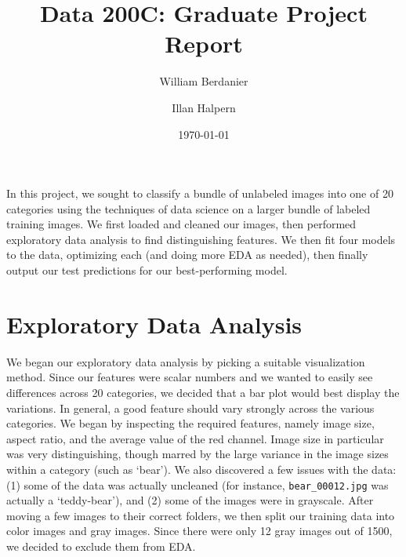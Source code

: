 \documentclass[aps,prl,twocolumn,superscriptaddress]{revtex4-1}
\renewcommand{\=}[1]{\stackrel{#1}{=}} %
\begin{document}
\title{Data 200C: Graduate Project Report}

\author{William Berdanier}

\author{Illan Halpern}

\date{\today}


\maketitle

In this project, we sought to classify a bundle of unlabeled images into one of 20 categories using the techniques of data science on a  larger bundle of labeled training images. We first loaded and cleaned our images, then performed exploratory data analysis to find distinguishing features. We then fit four models to the data, optimizing each (and doing more EDA as needed), then finally output our test predictions for our best-performing model. 

\section{Exploratory Data Analysis}

We began our exploratory data analysis by picking a suitable visualization method. Since our features were scalar numbers and we wanted to easily see differences across 20 categories, we decided that a bar plot would best display the variations. In general, a good feature should vary strongly across the various categories. We began by inspecting the required features, namely image size, aspect ratio, and the average value of the red channel. Image size in particular was very distinguishing, though marred by the large variance in the image sizes within a category (such as `bear'). We also discovered a few issues with the data: (1) some of the data was actually uncleaned (for instance, \texttt{bear\_00012.jpg} was actually a `teddy-bear'), and (2) some of the images were in grayscale. After moving a few images to their correct folders, we then split our training data into color images and gray images. Since there were only 12 gray images out of 1500, we decided to exclude them from EDA.
\end{document}
